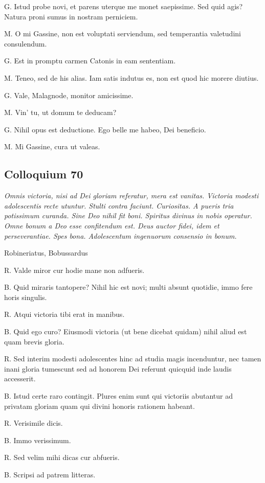 \documentclass{article}
\begin{document}
G. Istud probe novi, et parens uterque me monet saepissime. Sed quid agis? Natura proni sumus in nostram perniciem. 

M. O mi Gassine, non est voluptati serviendum, sed temperantia valetudini consulendum.

G. Est in promptu carmen Catonis in eam sententiam. 

M. Teneo, sed de his alias. Iam satis indutus es, non est quod hic morere diutius. 

G. Vale, Malagnode, monitor amicissime. 

M. Vin’ tu, ut domum te deducam?

G. Nihil opus est deductione. Ego belle me habeo, Dei beneficio. 

M. Mi Gassine, cura ut valeas.

\subsection{Colloquium 70}
\emph{Omnis victoria, nisi ad Dei gloriam referatur, mera est vanitas. Victoria modesti adolescentis recte utuntur. Stulti contra faciunt. Curiositas. A pueris tria potissimum curanda. Sine Deo nihil fit boni. Spiritus divinus in nobis operatur. Omne bonum a Deo esse confitendum est. Deus auctor fidei, idem et perseverantiae. Spes bona. Adolescentum ingenuorum consensio in bonum.}

Robineriatus, Bobussardus

R. Valde miror cur hodie mane non adfueris. 

B. Quid miraris tantopere? Nihil hic est novi; multi absunt quotidie, immo fere horis singulis. 

R. Atqui victoria tibi erat in manibus. 

B. Quid ego curo? Eiusmodi victoria (ut bene dicebat quidam) nihil aliud est quam brevis gloria. 

R. Sed interim modesti adolescentes hinc ad studia magis incenduntur, nec tamen inani gloria tumescunt sed ad honorem Dei referunt quicquid inde laudis accesserit. 

B. Istud certe raro contingit. Plures enim sunt qui victoriis abutantur ad privatam gloriam quam qui divini honoris rationem habeant. 

R. Verisimile dicis. 

B. Immo verissimum. 

R. Sed velim mihi dicas cur abfueris. 

B. Scripsi ad patrem litteras. 
\end{document}
